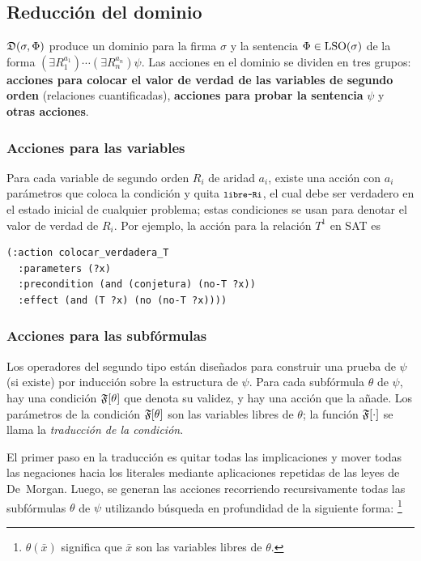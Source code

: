 
\subsection{Reducción del dominio}

$\mathfrak{D}(\sigma,\Phi)$ produce un dominio para la firma
$\sigma$ y la sentencia $\Phi\in\text{LSO}(\sigma)$ de la forma
$(\exists R_1^{a_1})\cdots(\exists R_n^{a_n})\psi$.
Las acciones en el dominio se dividen en tres grupos: \textbf{acciones para 
colocar el valor de verdad de las variables de segundo orden} (relaciones
cuantificadas), \textbf{acciones para probar la sentencia} $\psi$ y \textbf{otras
acciones}.

\subsubsection{Acciones para las variables}
Para cada variable de segundo orden $R_i$ de aridad $a_i$,
existe una acción  con $a_i$ parámetros que
coloca la condición  y quita ${\texttt{\footnotesize libre-Ri}}$, el cual debe ser
verdadero en el estado inicial de cualquier problema;
estas condiciones se usan para denotar el valor de
verdad de $R_i$. Por ejemplo, la acción para la relación $T^1$ en SAT es

{\footnotesize
\begin{Verbatim}
(:action colocar_verdadera_T
  :parameters (?x)
  :precondition (and (conjetura) (no-T ?x))
  :effect (and (T ?x) (no (no-T ?x))))
\end{Verbatim}
}

\subsubsection{Acciones para las subfórmulas}
Los operadores del segundo tipo están diseñados para construir una prueba de
$\psi$ (si existe) por inducción sobre la estructura de $\psi$.
Para cada subfórmula $\theta$ de $\psi$, hay una condición
$\mathfrak{F}[\theta]$ que denota su validez, y hay una acción que la añade.
Los parámetros de la condición $\mathfrak{F}[\theta]$ son las variables libres de
$\theta$; la función $\mathfrak{F}[\cdot]$ se llama la \textit{traducción de la
condición}.

El primer paso en la traducción es quitar todas las implicaciones
y mover todas las negaciones hacia los literales mediante aplicaciones
repetidas de las leyes de De~Morgan. Luego, se generan las acciones recorriendo
recursivamente todas las subfórmulas $\theta$ de $\psi$ utilizando
búsqueda en profundidad de la siguiente forma:
\footnote{$\theta(\bar x)$ significa que
$\bar x$ son las variables libres de $\theta$.}

